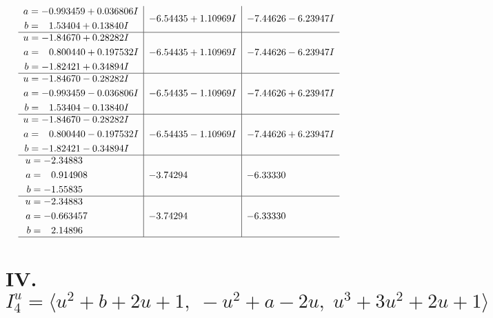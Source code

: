 \documentclass[1p]{elsarticle_modified}
\theoremstyle{definition}
\begin{document}
$$\begin{array}{c|c|c}
\begin{aligned}
a &= -0.993459 + 0.036806 I \\
b &= \phantom{-}1.53404 + 0.13840 I\end{aligned}
 & -6.54435 + 1.10969 I & -7.44626 - 6.23947 I \\ \hline\begin{aligned}
u &= -1.84670 + 0.28282 I \\
a &= \phantom{-}0.800440 + 0.197532 I \\
b &= -1.82421 + 0.34894 I\end{aligned}
 & -6.54435 + 1.10969 I & -7.44626 - 6.23947 I \\ \hline\begin{aligned}
u &= -1.84670 - 0.28282 I \\
a &= -0.993459 - 0.036806 I \\
b &= \phantom{-}1.53404 - 0.13840 I\end{aligned}
 & -6.54435 - 1.10969 I & -7.44626 + 6.23947 I \\ \hline\begin{aligned}
u &= -1.84670 - 0.28282 I \\
a &= \phantom{-}0.800440 - 0.197532 I \\
b &= -1.82421 - 0.34894 I\end{aligned}
 & -6.54435 - 1.10969 I & -7.44626 + 6.23947 I \\ \hline\begin{aligned}
u &= -2.34883\phantom{ +0.000000I} \\
a &= \phantom{-}0.914908\phantom{ +0.000000I} \\
b &= -1.55835\phantom{ +0.000000I}\end{aligned}
 & -3.74294\phantom{ +0.000000I} & -6.33330\phantom{ +0.000000I} \\ \hline\begin{aligned}
u &= -2.34883\phantom{ +0.000000I} \\
a &= -0.663457\phantom{ +0.000000I} \\
b &= \phantom{-}2.14896\phantom{ +0.000000I}\end{aligned}
 & -3.74294\phantom{ +0.000000I} & -6.33330\phantom{ +0.000000I}\\
 \hline 
 \end{array}$$\newpage\newpage\renewcommand{\arraystretch}{1}
\centering \section*{IV. $I^u_{4}= \langle u^2+b+2 u+1,\;- u^2+a-2 u,\;u^3+3 u^2+2 u+1 \rangle$}
\end{document}
